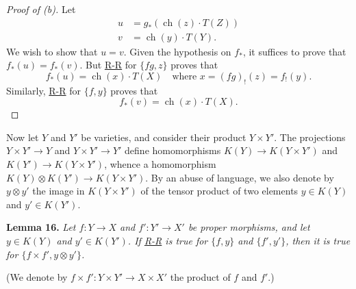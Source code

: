 \documentclass{article}
\newenvironment{itenv}[1]
  {\phantomsection\par\medskip\noindent\textbf{#1.}\itshape}
  {\medskip}
\DeclareMathOperator{\ch}{ch}
\begin{document}
\begin{proof}[Proof of (b)]
  Let
  \begin{align*}
    u &= g_*(\ch(z)\cdot T(Z))
  \\v &= \ch(y)\cdot T(Y).
  \end{align*}
  We wish to show that $u=v$.
  Given the hypothesis on $f_*$, it suffices to prove that $f_*(u)=f_*(v)$.
  But \hyperref[theoremriemannroch]{R-R} for $\{fg,z\}$ proves that
  \[
    f_*(u) = \ch(x)\cdot T(X)
    \quad
    \mbox{where $x=(fg)_!(z)=f_!(y)$.}
  \]
  Similarly, \hyperref[theoremriemannroch]{R-R} for $\{f,y\}$ proves that
  \[
    f_*(v) = \ch(x)\cdot T(X).
  \]
\end{proof}

Now let $Y$ and $Y'$ be varieties, and consider their product $Y\times Y'$.
The projections $Y\times Y'\to Y$ and $Y\times Y'\to Y'$ define homomorphisms $K(Y)\to K(Y\times Y')$ and $K(Y')\to K(Y\times Y')$, whence a homomorphism $K(Y)\otimes K(Y')\to K(Y\times Y')$.
By an abuse of language, we also denote by $y\otimes y'$ the image in $K(Y\times Y')$ of the tensor product of two elements $y\in K(Y)$ and $y'\in K(Y')$.

\begin{itenv}{Lemma 16}
\label{lemma16}
  Let $f\colon Y\to X$ and $f'\colon Y'\to X'$ be proper morphisms, and let $y\in K(Y)$ and $y'\in K(Y')$.
  If \hyperref[theoremriemannroch]{R-R} is true for $\{f,y\}$ and $\{f',y'\}$, then it is true for $\{f\times f',y\otimes y'\}$.
\end{itenv}

(We denote by $f\times f'\colon Y\times Y'\to X\times X'$ the product of $f$ and $f'$.)
\end{document}
